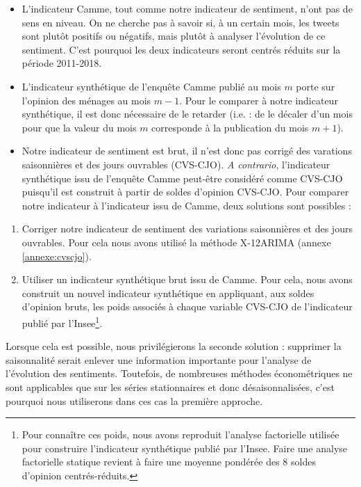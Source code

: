 \documentclass[11pt,french,french]{article}
\let\rmarkdownfootnote\footnote%
\def\footnote{\protect\rmarkdownfootnote}
\begin{document}
\begin{itemize}
\item
  L'indicateur Camme, tout comme notre indicateur de sentiment, n'ont
  pas de sens en niveau. On ne cherche pas à savoir si, à un certain
  mois, les tweets sont plutôt positifs ou négatifs, mais plutôt à
  analyser l'évolution de ce sentiment. C'est pourquoi les deux
  indicateurs seront centrés réduits sur la période 2011-2018.
\item
  L'indicateur synthétique de l'enquête Camme publié au mois \(m\) porte
  sur l'opinion des ménages au mois \(m-1\). Pour le comparer à notre
  indicateur synthétique, il est donc nécessaire de le retarder (i.e. :
  de le décaler d'un mois pour que la valeur du mois \(m\) corresponde à
  la publication du mois \(m+1\)).
\item
  Notre indicateur de sentiment est brut, il n'est donc pas corrigé des
  varations saisonnières et des jours ouvrables (CVS-CJO). \emph{A
  contrario}, l'indicateur synthétique issu de l'enquête Camme peut-être
  considéré comme CVS-CJO puisqu'il est construit à partir de soldes
  d'opinion CVS-CJO. Pour comparer notre indicateur à l'indicateur issu
  de Camme, deux solutions sont possibles :
\end{itemize}

\begin{enumerate}
\def\labelenumi{\arabic{enumi}.}
\item
  Corriger notre indicateur de sentiment des variations saisonnières et
  des jours ouvrables. Pour cela nous avons utilisé la méthode X-12ARIMA
  (annexe \ref{annexe:cvscjo}).
\item
  Utiliser un indicateur synthétique brut issu de Camme. Pour cela, nous
  avons construit un nouvel indicateur synthétique en appliquant, aux
  soldes d'opinion bruts, les poids associés à chaque variable CVS-CJO
  de l'indicateur publié par l'Insee\footnote{Pour connaître ces poids,
    nous avons reproduit l'analyse factorielle utilisée pour construire
    l'indicateur synthétique publié par l'Insee. Faire une analyse
    factorielle statique revient à faire une moyenne pondérée des 8
    soldes d'opinion centrés-réduits.}.
\end{enumerate}

Lorsque cela est possible, nous privilégierons la seconde solution :
supprimer la saisonnalité serait enlever une information importante pour
l'analyse de l'évolution des sentiments. Toutefois, de nombreuses
méthodes économétriques ne sont applicables que sur les séries
stationnaires et donc désaisonnalisées, c'est pourquoi nous utiliserons
dans ces cas la première approche.
\end{document}

